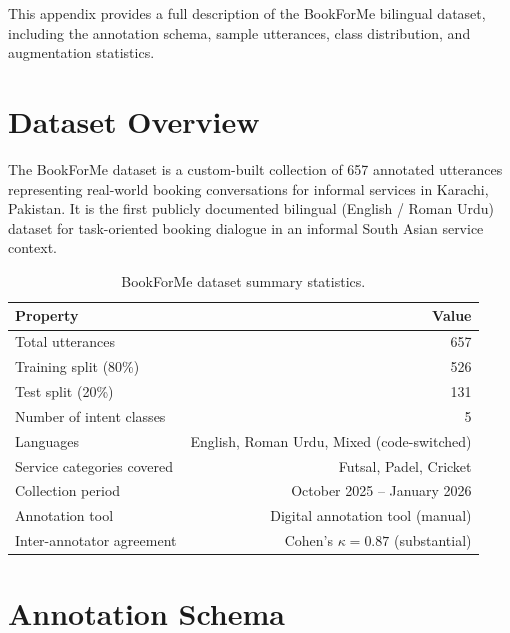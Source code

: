 This appendix provides a full description of the BookForMe bilingual dataset,
including the annotation schema, sample utterances, class distribution, and
augmentation statistics.

\section{Dataset Overview}
\label{app:data-overview}

The BookForMe dataset is a custom-built collection of 657 annotated utterances
representing real-world booking conversations for informal services in Karachi,
Pakistan.  It is the first publicly documented bilingual (English / Roman Urdu)
dataset for task-oriented booking dialogue in an informal South Asian service
context.

\begin{table}[H]
\centering
\caption{BookForMe dataset summary statistics.}
\label{tab:data-summary}
\begin{tabularx}{0.75\textwidth}{Xr}
\toprule
\textbf{Property} & \textbf{Value} \\
\midrule
Total utterances                & 657 \\
Training split (80\%)           & 526 \\
Test split (20\%)               & 131 \\
Number of intent classes        & 5 \\
Languages                       & English, Roman Urdu, Mixed (code-switched) \\
Service categories covered      & Futsal, Padel, Cricket \\
Collection period               & October 2025 -- January 2026 \\
Annotation tool                 & Digital annotation tool (manual) \\
Inter-annotator agreement       & Cohen's $\kappa = 0.87$ (substantial) \\
\bottomrule
\end{tabularx}
\end{table}

\section{Annotation Schema}
\label{app:data-schema}

